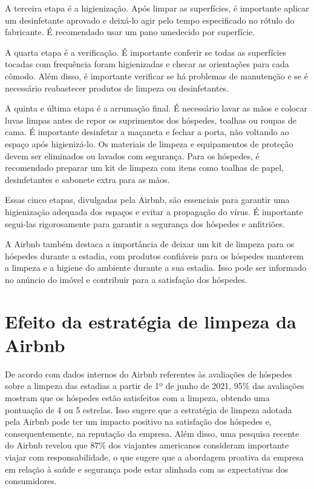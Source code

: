 \documentclass{article}
\begin{document}
A terceira etapa é a higienização. Após limpar as superfícies, é importante aplicar um desinfetante aprovado e deixá-lo agir pelo tempo especificado no rótulo do fabricante. É recomendado usar um pano umedecido por superfície.

A quarta etapa é a verificação. É importante conferir se todas as superfícies tocadas com frequência foram higienizadas e checar as orientações para cada cômodo. Além disso, é importante verificar se há problemas de manutenção e se é necessário reabastecer produtos de limpeza ou desinfetantes.

A quinta e última etapa é a arrumação final. É necessário lavar as mãos e colocar luvas limpas antes de repor os suprimentos dos hóspedes, toalhas ou roupas de cama. É importante desinfetar a maçaneta e fechar a porta, não voltando ao espaço após higienizá-lo. Os materiais de limpeza e equipamentos de proteção devem ser eliminados ou lavados com segurança. Para os hóspedes, é recomendado preparar um kit de limpeza com itens como toalhas de papel, desinfetantes e sabonete extra para as mãos.

Essas cinco etapas, divulgadas pela Airbnb, são essenciais para garantir uma higienização adequada dos espaços e evitar a propagação do vírus. É importante segui-las rigorosamente para garantir a segurança dos hóspedes e anfitriões.

A Airbnb também destaca a importância de deixar um kit de limpeza para os hóspedes durante a estadia, com produtos confiáveis para os hóspedes manterem a limpeza e a higiene do ambiente durante a sua estadia. Isso pode ser informado no anúncio do imóvel e contribuir para a satisfação dos hóspedes.
\section*{Efeito da estratégia de limpeza da Airbnb}
De acordo com dados internos do Airbnb referentes às avaliações de hóspedes sobre a limpeza das estadias a partir de 1º de junho de 2021, 95\% das avaliações mostram que os hóspedes estão satisfeitos com a limpeza, obtendo uma pontuação de 4 ou 5 estrelas. Isso sugere que a estratégia de limpeza adotada pela Airbnb pode ter um impacto positivo na satisfação dos hóspedes e, consequentemente, na reputação da empresa. Além disso, uma pesquisa recente do Airbnb revelou que 87\% dos viajantes americanos consideram importante viajar com responsabilidade, o que sugere que a abordagem proativa da empresa em relação à saúde e segurança pode estar alinhada com as expectativas dos consumidores.
\vspace{3cm}
\end{document}
